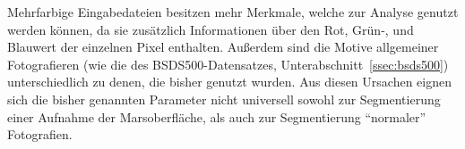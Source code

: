 Mehrfarbige Eingabedateien besitzen mehr Merkmale, welche zur Analyse genutzt werden können, da sie zusätzlich Informationen über den Rot, Grün-, und Blauwert der einzelnen Pixel enthalten. Außerdem sind die Motive allgemeiner Fotografieren (wie \zB die des BSDS500-Datensatzes, \vgl Unterabschnitt~\ref{ssec:bsds500}) unterschiedlich zu denen, die bisher genutzt wurden.
Aus diesen Ursachen eignen sich die bisher genannten Parameter nicht universell sowohl zur Segmentierung einer Aufnahme der Marsoberfläche, als auch zur Segmentierung \enquote{normaler} Fotografien.